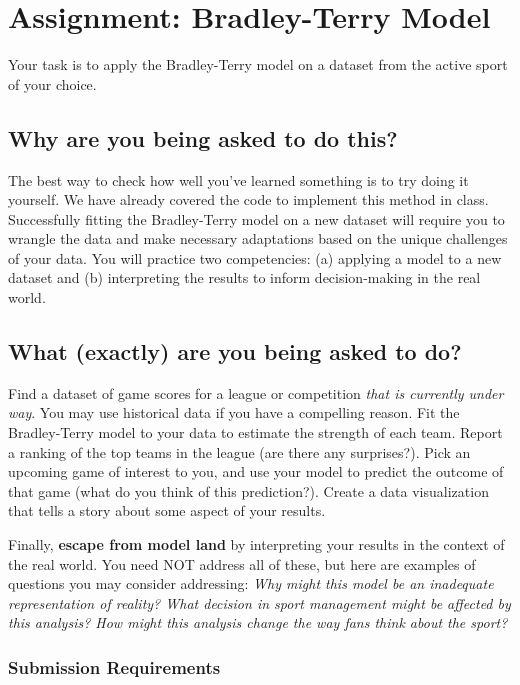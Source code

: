 \documentclass{article}
\begin{document}
  \section*{\sc Assignment: Bradley-Terry Model}

    Your task is to apply the Bradley-Terry model on a dataset from the active sport of your choice.
  
    \subsection*{\sc Why are you being asked to do this?}

      The best way to check how well you've learned something is to try doing it yourself. We have already covered the code to implement this method in class. Successfully fitting the Bradley-Terry model on a new dataset will require you to wrangle the data and make necessary adaptations based on the unique challenges of your data. You will practice two competencies: (a) applying a model to a new dataset and (b) interpreting the results to inform decision-making in the real world.

    \subsection*{\sc What (exactly) are you being asked to do?}

      Find a dataset of game scores for a league or competition {\it that is currently under way}. You may use historical data if you have a compelling reason. Fit the Bradley-Terry model to your data to estimate the strength of each team. Report a ranking of the top teams in the league (are there any surprises?). Pick an upcoming game of interest to you, and use your model to predict the outcome of that game (what do you think of this prediction?). Create a data visualization that tells a story about some aspect of your results.

      Finally, {\bf escape from model land} by interpreting your results in the context of the real world. You need NOT address all of these, but here are examples of questions you may consider addressing: {\it Why might this model be an inadequate representation of reality? What decision in sport management might be affected by this analysis? How might this analysis change the way fans think about the sport?}

      \subsubsection*{\sc Submission Requirements}
\end{document}
